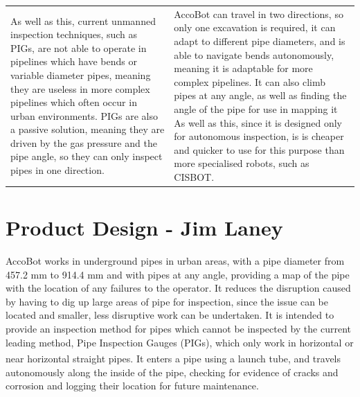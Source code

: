 \documentclass[11pt]{article}		%
\newcommand{\supercite}[1]{\textsuperscript{\cite{#1}}}		%
\begin{document}
\begin{longtable}[c]{| m{} | m{} |}
			As well as this, current unmanned inspection techniques, such as PIGs, are not able to operate in pipelines which have bends or variable diameter pipes, meaning they are useless in more complex pipelines which often occur in urban environments.
			PIGs are also a passive solution, meaning they are driven by the gas pressure and the pipe angle, so they can only inspect pipes in one direction.
			& 
			AccoBot can travel in two directions, so only one excavation is required, it can adapt to different pipe diameters, and is able to navigate bends autonomously, meaning it is adaptable for more complex pipelines.
			It can also climb pipes at any angle, as well as finding the angle of the pipe for use in mapping it
			As well as this, since it is designed only for autonomous inspection, is is cheaper and quicker to use for this purpose than more specialised robots, such as CISBOT.
			\label{solutionTable}
		\end{longtable}
		
		
	\section[Product Design - ENG]{Product Design - Jim Laney}

		AccoBot works in underground pipes in urban areas, with a pipe diameter from 457.2 mm to 914.4 mm and with pipes at any angle, providing a map of the pipe with the location of any failures to the operator. %
		It reduces the disruption caused by having to dig up large areas of pipe for inspection, since the issue can be located and smaller, less disruptive work can be undertaken.
		It is intended to provide an inspection method for pipes which cannot be inspected by the current leading method, Pipe Inspection Gauges (PIGs), which only work in horizontal or near horizontal straight pipes\supercite{mills2017advances}.
		It enters a pipe using a launch tube, and travels autonomously along the inside of the pipe, checking for evidence of cracks and corrosion and logging their location for future maintenance.
		\\
		
\end{document}
